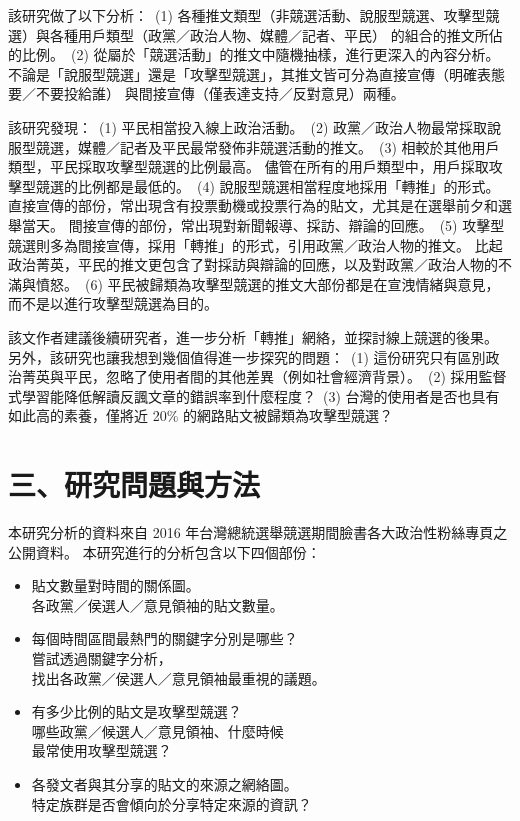 \documentclass[letterpaper, 10pt, conference]{ieeeconf}   %
\begin{document}
\begin{CJK}{UTF8}{bsmi}
該研究做了以下分析：%
\,(1) 各種推文類型（非競選活動、說服型競選、攻擊型競選）與各種用戶類型（政黨／政治人物、媒體／記者、平民）%
的組合的推文所佔的比例。%
\,(2) 從屬於「競選活動」的推文中隨機抽樣，進行更深入的內容分析。%
不論是「說服型競選」還是「攻擊型競選」，其推文皆可分為直接宣傳（明確表態要／不要投給誰）%
與間接宣傳（僅表達支持／反對意見）兩種。%

該研究發現：%
\,(1) 平民相當投入線上政治活動。%
\,(2) 政黨／政治人物最常採取說服型競選，媒體／記者及平民最常發佈非競選活動的推文。%
\,(3) 相較於其他用戶類型，平民採取攻擊型競選的比例最高。%
儘管在所有的用戶類型中，用戶採取攻擊型競選的比例都是最低的。%
\,(4) 說服型競選相當程度地採用「轉推」的形式。%
直接宣傳的部份，常出現含有投票動機或投票行為的貼文，尤其是在選舉前夕和選舉當天。%
間接宣傳的部份，常出現對新聞報導、採訪、辯論的回應。%
\,(5) 攻擊型競選則多為間接宣傳，採用「轉推」的形式，引用政黨／政治人物的推文。%
比起政治菁英，平民的推文更包含了對採訪與辯論的回應，以及對政黨／政治人物的不滿與憤怒。%
\,(6) 平民被歸類為攻擊型競選的推文大部份都是在宣洩情緒與意見，而不是以進行攻擊型競選為目的。%

該文作者建議後續研究者，進一步分析「轉推」網絡，並探討線上競選的後果。%
另外，該研究也讓我想到幾個值得進一步探究的問題：%
\,(1) 這份研究只有區別政治菁英與平民，忽略了使用者間的其他差異（例如社會經濟背景）。%
\,(2) 採用監督式學習能降低解讀反諷文章的錯誤率到什麼程度？%
\,(3) 台灣的使用者是否也具有如此高的素養，僅將近 20\% 的網路貼文被歸類為攻擊型競選？%

\section*{三、研究問題與方法}

本研究分析的資料來自 2016 年台灣總統選舉競選期間臉書各大政治性粉絲專頁之公開資料。%
本研究進行的分析包含以下四個部份：%
\begin{itemize}
\item 貼文數量對時間的關係圖。\\
各政黨／侯選人／意見領袖的貼文數量。%
\item 每個時間區間最熱門的關鍵字分別是哪些？\\
嘗試透過關鍵字分析，\\
找出各政黨／侯選人／意見領袖最重視的議題。%
\item 有多少比例的貼文是攻擊型競選？\\
哪些政黨／候選人／意見領袖、什麼時候\\
最常使用攻擊型競選？%
\item 各發文者與其分享的貼文的來源之網絡圖。\\
特定族群是否會傾向於分享特定來源的資訊？%
\end{itemize}


\end{CJK}
\end{document}
